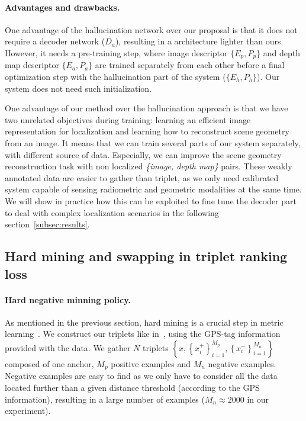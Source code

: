 \paragraph{Advantages and drawbacks.}
\label{paragraph:adv}
One advantage of the hallucination network over our proposal is that it does not require a decoder network ($D_a$), resulting in a architecture lighter than ours. However, it needs a pre-training step, where image descriptor $\{E_p, P_p\}$ and depth map descriptor $\{E_a, P_a\}$ are trained separately from each other before a final optimization step with the hallucination part of the system ($\{E_h, P_h\}$). Our system does not need such initialization. 

One advantage of our method over the hallucination approach is that we have two unrelated objectives during training: learning an efficient image representation for localization and learning how to reconstruct scene geometry from an image. It means that we can train several parts of our system separately, with different source of data. Especially, we can improve the scene geometry reconstruction task with non localized \textit{\{image, depth map\}} pairs. These weakly annotated data are easier to gather than triplet, as we only need calibrated system capable of sensing radiometric and geometric modalities at the same time. We will show in practice how this can be exploited to fine tune the decoder part to deal with complex localization scenarios in the following section~\ref{subsec:results}.

\subsection{Hard mining and swapping in triplet ranking loss}
\label{subsec:hard_minning}

\paragraph{Hard negative minning policy.} As mentioned in the previous section, hard mining is a crucial step in metric learning~\citep{Arandjelovic2017,Radenovic2017,Gordo2016,Iscen2018}. We construct our triplets like in~\citep{Arandjelovic2017}, using the GPS-tag information provided with the data. We gather $N$ triplets $\left\lbrace x, \left\lbrace x^+_i\right\rbrace_{i=1}^{M_p}, \left\lbrace x^-_i\right\rbrace_{i=1}^{M_n} \right\rbrace$ composed of one anchor, $M_p$ positive examples and $M_n$ negative examples. Negative examples are easy to find as we only have to consider all the data located further than a given distance threshold (according to the GPS information), resulting in a large number of examples ($M_n \approx 2000$ in our experiment). 

